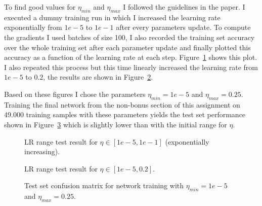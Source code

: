 \documentclass{article}
\begin{document}
To find good values for $\eta_{min}$ and $\eta_{max}$ I followed the
guidelines in the paper. I executed a dummy training run in which I increased
the learning rate exponentially from $1e-5$ to $1e-1$ after every parameters
update. To compute the gradients I used batches of size 100, I also recorded
the training set accuracy over the whole training set after each parameter
update and finally plotted this accuracy as a function of the learning rate at
each step. Figure~\ref{fig:lr_range_log} shows this plot. I also repeated this
process but this time linearly increased the learning rate from $1e-5$ to $0.2$,
the results are shown in Figure~\ref{fig:lr_range_linear}.

Based on these figures I chose the parameters $\eta_{min} = 1e-5$ and
$\eta_{max} = 0.25$. Training the final network from the non-bonus section of
this assignment on 49.000 training samples with these parameters yields the test
set performance shown in Figure~\ref{fig:lr_performance} which is slightly lower
than with the initial range for $\eta$.

\begin{figure}[H]
  \centering
    
  \caption{LR range test result for $\eta \in [1e-5, 1e-1]$ (exponentially increasing).}
  \label{fig:lr_range_log}
\end{figure}

\begin{figure}[H]
  \centering
    
  \caption{LR range test result for $\eta \in [1e-5, 0.2]$.}
  \label{fig:lr_range_linear}
\end{figure}

\begin{figure}[H]
  \centering
    
  \caption{Test set confusion matrix for network training with
           $\eta_{min} = 1e-5$ and $\eta_{max} = 0.25$.}
  \label{fig:lr_performance}
\end{figure}
\end{document}
